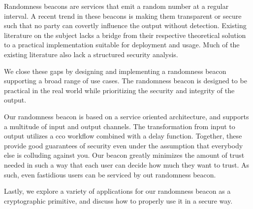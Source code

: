 Randomness beacons are services that emit a random number at a regular interval.
A recent trend in these beacons is making them transparent or secure such that no party can covertly influence the output without detection.
Existing literature on the subject lacks a bridge from their respective theoretical solution to a practical implementation suitable for deployment and usage. Much of the existing literature also lack a structured security analysis.

We close these gaps by designing and implementing a randomness beacon supporting a broad range of use cases. The randomness beacon is designed to be practical in the real world while prioritizing the security and integrity of the output.

Our randomness beacon is based on a service oriented architecture, and supports a multitude of input and output channels.
The transformation from input to output utilizes a \gls{cco} workflow combined with a delay function. Together, these provide good guarantees of security even under the assumption that everybody else is colluding against you.
Our beacon greatly minimizes the amount of trust needed in such a way that each user can decide how much they want to trust. As such, even fastidious users can be serviced by out randomness beacon.

Lastly, we explore a variety of applications for our randomness beacon as a cryptographic primitive, and discuss how to properly use it in a secure way.

\glsresetall